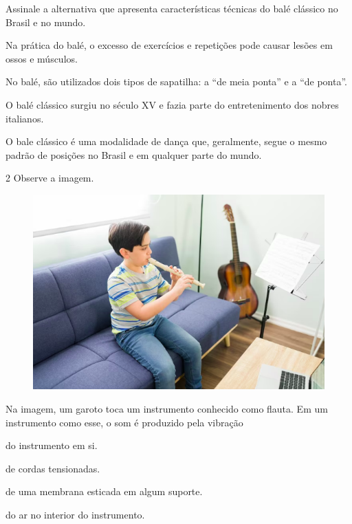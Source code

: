 Assinale a alternativa que apresenta características técnicas do balé
clássico no Brasil e no mundo.

\begin{escolha}
\item
  Na prática do balé, o excesso de exercícios e repetições pode causar
  lesões em ossos e músculos.
\item
  No balé, são utilizados dois tipos de sapatilha: a “de meia ponta” e
  a “de ponta”.
\item
  O balé clássico surgiu no século XV e fazia parte do entretenimento
  dos nobres italianos.
\item
  O bale clássico é uma modalidade de dança que, geralmente, segue o
  mesmo padrão de posições no Brasil e em qualquer parte do mundo.
\end{escolha}


\pagebreak
\num{2} Observe a imagem.

\begin{figure}[htpb!]
\includegraphics[width=\textwidth]{./imgs/art41.png}
\end{figure}

Na imagem, um garoto toca um instrumento conhecido como flauta. Em um instrumento como esse, o som é produzido pela vibração

\begin{escolha}
\item
  do instrumento em si.
\item
  de cordas tensionadas.
\item
  de uma membrana esticada em algum suporte.
\item
  do ar no interior do instrumento.
\end{escolha}

